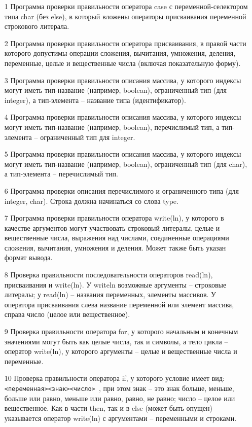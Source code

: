 \begin{enumerate}
\item[1] Программа проверки правильности оператора case с переменной-селектором типа char (без else), в который
вложены операторы присваивания переменной строкового литерала.
\item[2] Программа проверки правильности оператора присваивания, в правой части которого допустимы
операции сложения, вычитания, умножения, деления, переменные, целые и вещественные числа (включая показательную форму).
\item[3] Программа проверки правильности описания массива, у которого индексы могут иметь тип-название
(например, boolean), ограниченный тип (для integer), а тип-элемента -- название типа (идентификатор).
\item[4] Программа проверки правильности описания массива, у которого индексы могут иметь тип-название
(например, boolean), перечислимый тип, а тип-элемента -- ограниченный тип для integer.
\item[5] Программа проверки правильности описания массива, у которого индексы могут иметь тип-название
(например, boolean), ограниченный тип (для char), а тип-элемента -- перечислимый тип.
\item[6] Программа проверки описания перечислимого и ограниченного типа (для integer, char). Строка должна начинаться
со слова type.

\item[7] Программа проверки правильности оператора write(ln), у которого в качестве аргументов могут участвовать
строковый литералы, целые и вещественные числа, выражения над числами, соединенные операциями сложения, вычитания, умножения
и деления. Может также быть указан формат вывода.

\item[8] Проверка правильности последовательности операторов read(ln), присваивания и write(ln).
У writeln возможные аргументы --
строковые литералы; у read(ln) -- названия переменных, элементы массивов. У оператора присваивания
слева название переменной или элемент массива, справа число (целое или вещественное).

\item[9] Проверка правильности оператора for, у которого начальным и конечным значениями могут быть
как целые числа, так и символы, а тело цикла -- оператор write(ln), у которого аргументы --
целые и вещественные числа и переменные.

\item[10] Проверка правильности оператора if, у которого условие имеет вид: \verb| <переменная><знак><число> |,
при этом знак -- это знак больше, меньше, больше или равно, меньше или равно, равно, не равно; число -- целое или
вещественное. Как в части then, так и в else (может быть опущен) указывается оператор write(ln) с аргументами -- переменными
и строками.



\end{enumerate}
